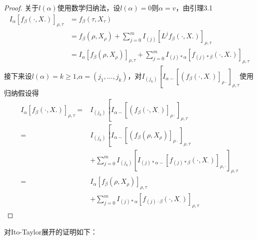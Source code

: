 \documentclass{article}%
\begin{document}
\begin{proof}
关于$l(\alpha)$使用数学归纳法，设$l(\alpha)=0$则$\alpha=v$，由引理3.1	
\begin{equation}
\begin{aligned}
I_{\alpha}\left[f_{\beta}(\cdot, X .)\right]_{\rho, \tau} &=f_{\beta}\left(\tau, X_{\tau}\right) \\
&=f_{\beta}\left(\rho, X_{\rho}\right)+\sum_{j=0}^{m} I_{(j)}\left[L^{j} f_{\beta}(\cdot, X .)\right]_{\rho, \tau} \\
&=I_{\alpha}\left[f_{\beta}\left(\rho, X_{\rho}\right)\right]_{\rho, \tau}+\sum_{j=0}^{m} I_{(j) * \alpha}\left[f_{(j) * \beta}(\cdot, X .)\right]_{\rho, \tau}
\end{aligned}
\end{equation}
接下来设$l(\alpha)=k \geq 1$,$\alpha=(j_1,...,j_k)$，对$I_{\left(j_{k}\right)}\left[I_{\alpha-}\left[\left(f_{\beta}\left(\cdot, X_{\cdot}\right)\right]_{\rho\cdot}\right]_{\rho, \tau}\right.$使用归纳假设得
\begin{equation}
\begin{aligned}
I_{\alpha}\left[f_{\beta}(\cdot, X .)\right]_{\rho, \tau}=& I_{\left(j_{k}\right)}\left[I_{\alpha-}\left[\left(f_{\beta}\left(\cdot, X_{\cdot}\right)\right]_{\rho\cdot}\right]_{\rho, \tau}\right.\\
=& I_{\left(j_{k}\right)}\left[I_{\alpha-}\left[\left(f_{\beta}\left(\rho, X_{\rho}\right)\right]_{\rho\cdot}\right]_{\rho, \tau}\right.\\
&+\sum_{j=0}^{m} I_{\left(j_{k}\right)}\left[I_{(j) * \alpha-}\left[f_{(j) * \beta}\left(\cdot, X_{\cdot}\right)\right]_{\rho, \cdot}\right]_{\rho, \tau} \\
=& I_{\alpha}\left[f_{\beta}\left(\rho, X_{\rho}\right)\right]_{\rho, \tau} \\
&+\sum_{j=0}^{m} I_{(j) * \alpha}\left[f_{(j) \cdot \beta}\left(\cdot, X_{\cdot}\right)\right]_{\rho, \tau}
\end{aligned}
\end{equation}
\end{proof}
对Ito-Taylor展开的证明如下：
\end{document}
